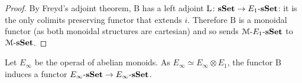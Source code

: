 \begin{refsection}
\begin{proof}
By Freyd's adjoint theorem, $\mathrm{B}$ has a left adjoint $\mathrm{L} \colon \mathbf{sSet} \to E_1 \textrm{-} \mathbf{sSet}$: it is the only colimits preserving functor that extends $i$. Therefore $\mathrm{B}$ is a monoidal functor (as both monoidal structures are cartesian) and so sends $\mathcal{M} \textrm{-} E_1 \textrm{-} \mathbf{sSet}$ to $\mathcal{M} \textrm{-} \mathbf{sSet}$.
\end{proof}

\begin{corollary}
Let $E_{\infty}$ be the operad of abelian monoids. As $E_{\infty} \simeq E_{\infty} \otimes E_1$, the functor $\mathrm{B}$ induces a functor $E_{\infty} \textrm{-} \mathbf{sSet} \to E_{\infty} \textrm{-} \mathbf{sSet}$.
\end{corollary}

\printbibliography[heading = local]

\end{refsection}
